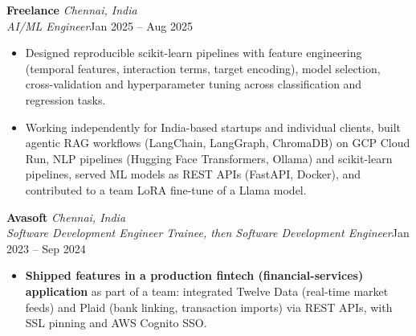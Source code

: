 \documentclass[a4paper,11pt]{article}
\newcommand{\role}[4]{%
  \textbf{#1}{\color{muted}\,\textperiodcentered\,\textit{#2}}\\
  \textit{#4}\hfill{\color{muted}#3}\par}
\newcommand{\gap}{\vspace{5pt}}
\newcommand{\num}[1]{\textbf{#1}}   %
\begin{document}
\gap
{}
\role{Freelance}{Chennai, India}{Jan 2025 – Aug 2025}{AI/ML Engineer}
\begin{itemize}
  \item Designed reproducible scikit-learn pipelines with feature engineering (temporal features, interaction terms, target encoding), model selection, cross-validation and hyperparameter tuning across classification and regression tasks.
  \item Working independently for India-based startups and individual clients, built agentic RAG workflows (LangChain, LangGraph, ChromaDB) on GCP Cloud Run, NLP pipelines (Hugging Face Transformers, Ollama) and scikit-learn pipelines, served ML models as REST APIs (FastAPI, Docker), and contributed to a team LoRA fine-tune of a Llama model.
\end{itemize}
\gap
{}
\role{Avasoft}{Chennai, India}{Jan 2023 – Sep 2024}{Software Development Engineer Trainee, then Software Development Engineer}
\begin{itemize}
  \item \num{Shipped features in a production fintech (financial-services) application} as part of a team: integrated Twelve Data (real-time market feeds) and Plaid (bank linking, transaction imports) via REST APIs, with SSL pinning and AWS Cognito SSO.
\end{itemize}
\end{document}
